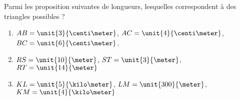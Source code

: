 
\begin{exercice}\label{exosmath-0769}

Parmi les proposition suivantes de longueurs, lesquelles correspondent à des triangles possibles ?
\begin{enumerate}
    \item
        \( AB=\unit{3}{\centi\meter}\), \( AC=\unit{4}{\centi\meter}\), \( BC=\unit{6}{\centi\meter}\).
    \item
        \( RS=\unit{10}{\meter}\), \( ST=\unit{3}{\meter}\), \( RT=\unit{14}{\meter}\)
    \item
        \( KL=\unit{5}{\kilo\meter}\), \( LM=\unit{300}{\meter}\), \( KM=\unit{4}{\kilo\meter}\)
\end{enumerate}

\end{exercice}
